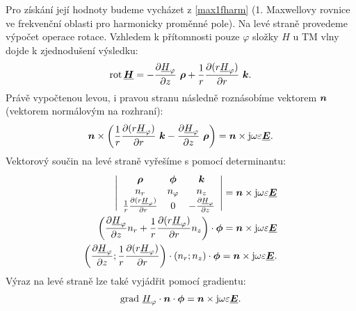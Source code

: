 \documentclass[12pt,a4paper,oneside]{article}
\numberwithin{equation}{section} %
\numberwithin{figure}{section} %
\numberwithin{table}{section} %
\newcommand{\mj}{\mathrm{j}} %
\renewcommand{\vec}[1]{\mbox{\boldmath$#1$}} %
\newcommand{\faz}[1]{{\underline{#1}}} %
\newcommand{\grad}{\mathrm{grad}\ }
\newcommand{\rot}{\mathrm{rot}\ }
\begin{document}
Pro získání její hodnoty budeme vycházet z \ref{max1fharm} (1. Maxwellovy rovnice ve frekvenční oblasti pro harmonicky proměnné pole). Na levé straně provedeme výpočet operace rotace. Vzhledem k přítomnosti pouze $\varphi$ složky $H$ u TM vlny dojde k zjednodušení výsledku:
\begin{equation}
\rot \! \faz{\vec{H}} = - \frac{\partial \faz{H} _{\varphi}}{\partial z} ~ \vec{\rho} + \frac{1}{r} \frac{\partial ( r \faz{H} _{\varphi} ) }{\partial r} ~ \vec{k} .
\end{equation}
Právě vypočtenou levou, i pravou stranu následně roznásobíme vektorem $\vec{n}$ (vektorem normálovým na rozhraní):
\begin{equation}
\vec{n} \times \left( \frac{1}{r} \frac{\partial ( r \faz{H} _{\varphi} ) }{\partial r} ~ \vec{k} - \frac{\partial \faz{H} _{\varphi}}{\partial z} ~ \vec{\rho} \right) = \vec{n} \times \mj \omega \varepsilon \faz{\vec{E}} .
\end{equation}
Vektorový součin na levé straně vyřešíme s pomocí determinantu:
\begin{subequations}
\begin{align}
\left| 
\begin{array}{c c c}
\vec{\rho} & \vec{\phi} & \vec{k} \\ 
n_r & n_{\varphi} & n_z \\
\frac{1}{r} \frac{\partial ( r \faz{H} _{\varphi} ) }{\partial r} & 0 & - \frac{\partial \faz{H} _{\varphi}}{\partial z}
\end{array}
\right|
= \vec{n} \times \mj \omega \varepsilon \faz{\vec{E}}
\\
\left( \frac{\partial \faz{H} _{\varphi}}{\partial z} n_{r} + \frac{1}{r} \frac{\partial ( r \faz{H} _{\varphi} ) }{\partial r} n_z \right) \cdot \vec{\phi} = \vec{n} \times \mj \omega \varepsilon \faz{\vec{E}}
\\
\left( \frac{\partial \faz{H} _{\varphi}}{\partial z} ;\frac{1}{r} \frac{\partial ( r \faz{H}_{\varphi} ) }{\partial r} \right) \cdot \left( n_r; n_{z} \right) \cdot \vec{\phi} = \vec{n} \times \mj \omega \varepsilon \faz{\vec{E}} .
\end{align}
\end{subequations}
Výraz na levé straně lze také vyjádřit pomocí gradientu:
\begin{equation}
\grad \faz{H} _{\varphi} \cdot \vec{n} \cdot \vec{\phi} = \vec{n} \times \mj \omega \varepsilon \faz{\vec{E}} .
\end{equation}
\end{document}
